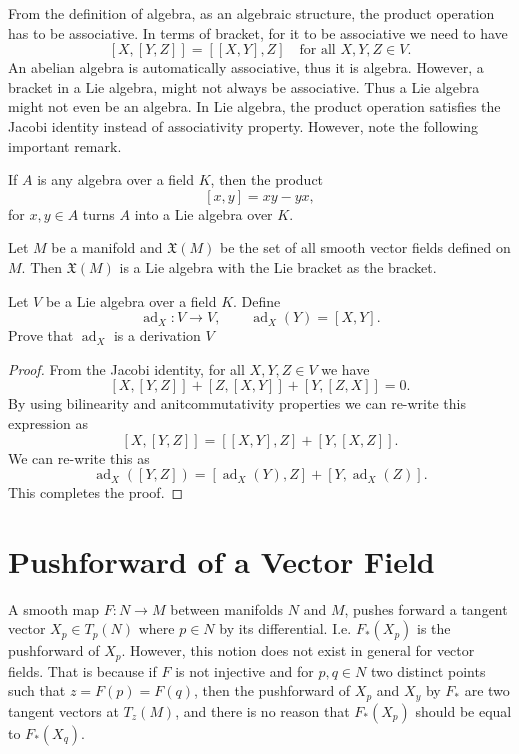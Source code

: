 \begin{carefull}
	From the definition of algebra, as an algebraic structure, the product operation has to be associative. In terms of bracket, for it to be associative we need to have 
	\[ [X,[Y,Z]] = [[X,Y],Z] \quad \text{for all } X,Y,Z \in V. \]
	An abelian algebra is automatically associative, thus it is algebra. However, a bracket in a Lie algebra, might not always be associative. Thus a Lie algebra might not even be an algebra. In Lie algebra, the product operation satisfies the Jacobi identity instead of associativity property. However, note the following important remark.
\end{carefull}
\begin{remark}
	If $ A $ is any algebra over a field $ K $, then the product 
	\[ [x,y] = xy - yx, \]
	for $ x,y \in A $ turns $ A $ into a Lie algebra over $ K $.
\end{remark}

\begin{example}
	Let $ M $ be a manifold and $ \mathfrak{X}(M) $ be the set of all smooth vector fields defined on $ M $. Then $ \mathfrak{X}(M) $ is a Lie algebra with the Lie bracket as the bracket.
\end{example}

\begin{proposition}
	Let $ V $ be a Lie algebra over a field $ K $. Define 
	\[ \operatorname{ad}_X: V \to V, \qquad \operatorname{ad}_X(Y) = [X,Y]. \]
	Prove that $ \operatorname{ad}_X $ is a derivation $ V $
\end{proposition}
\begin{proof}
	From the Jacobi identity, for all $ X,Y,Z \in V $ we have
	\[ [X,[Y,Z]] + [Z,[X,Y]] + [Y,[Z,X]] = 0. \]
	By using bilinearity and anitcommutativity properties we can re-write this expression as
	\[ [X,[Y,Z]] = [[X,Y],Z] + [Y,[X,Z]]. \]
	We can re-write this as
	\[ \operatorname{ad}_X([Y,Z]) = [\operatorname{ad}_X(Y),Z] + [Y,\operatorname{ad}_X(Z)].\]
	This completes the proof.
\end{proof}


\section{Pushforward of a Vector Field}
A smooth map $ F:N\to M $ between manifolds $ N $ and $ M $, pushes forward a tangent vector $ X_p \in T_p(N) $ where $ p \in N $ by its differential. I.e. $ F_*(X_p) $ is the pushforward of $ X_p $. However, this notion does not exist in general for vector fields. That is because if $ F $ is not injective and for $ p,q \in N $ two distinct points such that $ z = F(p) = F(q) $, then the pushforward of $ X_p $ and $ X_y $ by $ F_* $ are two tangent vectors at $ T_z(M) $, and there is no reason that $ F_*(X_p) $ should be equal to $ F_*(X_q) $.

